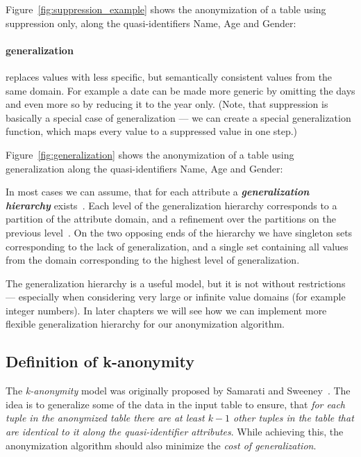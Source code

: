 Figure~\ref{fig:suppression_example} shows the anonymization of a table using suppression only, along the quasi-identifiers Name, Age and Gender:



\paragraph{generalization} replaces values with less specific, but semantically consistent values from the same domain.
For example a date can be made more generic by omitting the days and even more so by reducing it to the year only. (Note, that suppression is basically a special case of generalization --- we can create a special generalization function, which maps every value to a suppressed value in one step.)

Figure~\ref{fig:generalization} shows the anonymization of a table using generalization along the quasi-identifiers Name, Age and Gender:



In most cases we can assume, that for each attribute a \textit{\textbf{generalization hierarchy}} exists~\cite{aggarwal}.
Each level of the generalization hierarchy corresponds to a partition of the attribute domain, and a refinement over the partitions on the previous level~\cite{samarati-sweeney}.
On the two opposing ends of the hierarchy we have singleton sets corresponding to the lack of generalization, and a single set containing all values from the domain corresponding to the highest level of generalization.



The generalization hierarchy is a useful model, but it is not without restrictions --- especially when considering very large or infinite value domains (for example integer numbers).
In later chapters we will see how we can implement more flexible generalization hierarchy for our anonymization algorithm.

\subsection{Definition of k-anonymity}\label{subsec:definition_of_anonymity}

The \textit{k-anonymity} model was originally proposed by Samarati and Sweeney~\cite{samarati-sweeney,sweeney02}.
The idea is to generalize some of the data in the input table to ensure, that \textit{for each tuple in the anonymized table there are at least \(k-1\) other tuples in the table that are identical to it along the quasi-identifier attributes}.
While achieving this, the anonymization algorithm should also minimize the \textit{cost of generalization}.


